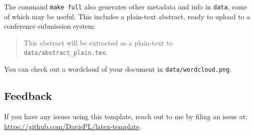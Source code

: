 The command \texttt{make full} also generates other metadata and info in \texttt{data}, some of which may be useful.
This includes a plain-text abstract, ready to upload to a conference submission system:

\begin{abstract}
This abstract will be extracted as a plain-text to \texttt{data/abstract\_plain.tex}.
\end{abstract}

You can check out a wordcloud of your document in \texttt{data/wordcloud.png}.

\subsection{Feedback}

If you have any issues using this template, reach out to me by filing an issue at:
\url{https://github.com/DavisPL/latex-template}.
